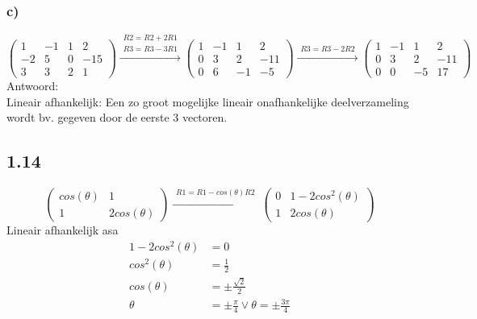 \documentclass[11pt]{article}
\begin{document}
\subsubsection*{c)}
\[
\begin{pmatrix}
  1 & -1 & 1 & 2 \\
  -2 & 5 & 0 & -15 \\
  3 & 3 & 2 & 1
 \end{pmatrix}
 \overset{\begin{matrix}
  R2 = R2+2R1\\
  R3 = R3-3R1
 \end{matrix}}{\rightarrow}
 \begin{pmatrix}
  1 & -1 & 1 & 2 \\
  0 & 3 & 2 & -11 \\
  0 & 6 & -1 & -5
 \end{pmatrix}
 \overset{\begin{matrix}
  R3 = R3-2R2
 \end{matrix}}{\rightarrow}
 \begin{pmatrix}
  1 & -1 & 1 & 2 \\
  0 & 3 & 2 & -11 \\
  0 & 0 & -5 & 17
 \end{pmatrix}
\]
Antwoord:\\
Lineair afhankelijk: Een zo groot mogelijke lineair onafhankelijke deelverzameling wordt bv. gegeven door de eerste 3 vectoren.


\subsection*{1.14}
\[
 \begin{pmatrix}
  cos(\theta) & 1\\
  1 & 2cos(\theta)
 \end{pmatrix}
 \overset{\begin{matrix}
  R1 = R1-cos(\theta)R2
 \end{matrix}}{\rightarrow}
 \begin{pmatrix}
  0 & 1-2cos^2(\theta)\\
  1 & 2cos(\theta)
 \end{pmatrix}
\]
Lineair afhankelijk asa
\begin{align*}
1-2cos^2(\theta) &= 0\\
cos^2(\theta) &= \frac{1}{2}\\
cos(\theta) &= \pm\frac{\sqrt{2}}{2}\\
\theta &= \pm\frac{\pi}{4} \vee \theta = \pm\frac{3\pi}{4}
\end{align*}
\end{document}
